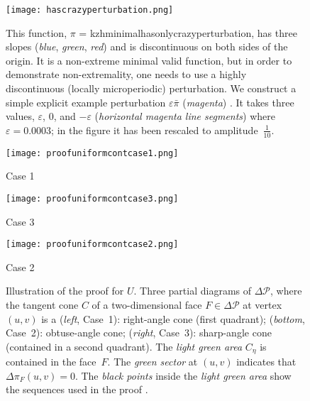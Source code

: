 \documentclass[10pt,reqno]{amsart}
\renewcommand{\P}{\mathcal{P}}
\newcommand{\0}{{\ve 0}}
\theoremstyle{definition}
\let\epsilon=\varepsilon
\let\Myunderscore=\textunderscore   %
\def\Myunderscore{\textunderscore}%
\newcommand\underscore{\Myunderscore\allowbreak}
\let\_=\underscore
\DeclareRobustCommand\sage[1]{\textsf{\upshape #1}}
\begin{document}
\begin{figure}[h]
\centering
\texttt{[image: has\_crazy\_perturbation.png]}
\caption{This function,
  \sage{$\pi$ = kzh\_minimal\_has\_only\_crazy\_perturbation\_1}, 
  has three slopes (\emph{blue}, \emph{green}, \emph{red}) and is
  discontinuous on both sides of the origin. 
  It is a non-extreme minimal valid function, 
  but in order to demonstrate non-extremality, one needs to use a highly
  discontinuous (locally microperiodic) perturbation.
  We construct a simple explicit example perturbation $\epsilon\bar\pi$
  (\emph{magenta})%
  .
  It takes three values, $\epsilon$, $0$, and $-\epsilon$ 
  (\emph{horizontal magenta line segments}) where $\epsilon=0.0003$; 
  in the figure it has been rescaled to amplitude~$\frac1{10}$.
}
\label{fig:has_crazy_perturbation}
\end{figure}

\def\COMMONSCALE{0.35}
\begin{figure}[hp]
\begin{minipage}{.48\textwidth}
\texttt{[image: proof\_uniform\_cont\_case\_1.png]}
\par\centering
  Case 1
\end{minipage}
\hfill
\begin{minipage}{.46\textwidth}
\texttt{[image: proof\_uniform\_cont\_case\_3.png]}
\par\centering
  Case 3
\end{minipage}
\vspace{3ex}\par
\centering
\begin{minipage}{.58\textwidth}
\texttt{[image: proof\_uniform\_cont\_case\_2.png]}
\par\centering
  Case 2
\end{minipage}
\caption{Illustration of the proof %
  for $U$. Three partial diagrams of 
  $\Delta\P$, where the tangent cone $C$ of a two-dimensional face $F\in
  \Delta\P$ at vertex $(u,v)$ is a (\textit{left}, Case~1): right-angle cone (first
  quadrant); 
  (\textit{bottom}, Case~2): obtuse-angle cone; (\textit{right}, Case~3):
  sharp-angle cone (contained in a second quadrant). The \emph{light green
    area} $C_\eta$ is contained in the face~$F$. The \emph{green sector} at
  $(u,v)$ indicates that 
  $\Delta\pi_F(u,v)=0$. The \emph{black points} inside the \emph{light green
    area} show the sequences used in the proof%
  .}
\label{fig:proof_uniform_continuous}
\end{figure}
\end{document}

